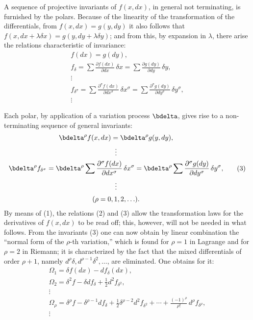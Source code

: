 \documentclass[11pt]{article}
\begin{document}
A sequence of projective invariants of \(f(x,dx)\), in general not
terminating, is furnished by the polars. Because of the linearity of the
transformation of the differentials, from \(f(x,dx)=g(y,dy)\) it also
follows that
\(f(x,dx+\lambda\delta x)=g(y,dy+\lambda\delta y)\); and from this, by
expansion in \(\lambda\), there arise the relations characteristic of
invariance:
\begin{equation}
\begin{gathered}
f(dx)=g(dy),\\
f_\delta=\sum\frac{\partial f(dx)}{\partial dx}\,\delta x
       =\sum\frac{\partial g(dy)}{\partial dy}\,\delta y,\\
\vdots\\
f_{\delta^\sigma}=
\sum\frac{\partial^\sigma f(dx)}{\partial dx^\sigma}\,\delta x^\sigma
=
\sum\frac{\partial^\sigma g(dy)}{\partial dy^\sigma}\,\delta y^\sigma,\\
\vdots
\end{gathered}
\tag{2}
\end{equation}

Each polar, by application of a variation process \(\bdelta\), gives rise
to a non-terminating sequence of general invariants:
\begin{equation}
\begin{gathered}
\bdelta^\rho f(x,dx)=\bdelta^\rho g(y,dy),\\
\vdots\\
\bdelta^\rho f_{\delta^\sigma}
=\bdelta^\rho\sum\frac{\partial^\sigma f(dx)}{\partial dx^\sigma}\,
\delta x^\sigma
=\bdelta^\rho\sum\frac{\partial^\sigma g(dy)}{\partial dy^\sigma}\,
\delta y^\sigma,\\
\vdots\\[0.2em]
(\rho=0,1,2,\ldots).
\end{gathered}
\tag{3}
\end{equation}
By means of (1), the relations (2) and (3) allow the transformation laws
for the derivatives of \(f(x,dx)\) to be read off; this, however, will
not be needed in what follows. From the invariants (3) one can now obtain
by linear combination the ``normal form of the \(\rho\)-th variation,''
which is found for \(\rho=1\) in Lagrange and for \(\rho=2\) in Riemann;
it is characterized by the fact that the mixed differentials of order
\(\rho+1\), namely \(d^\rho\delta,d^{\rho-1}\delta^2,\ldots\), are
eliminated. One obtains for it:
\begin{equation}
\begin{gathered}
\Omega_1=\delta f(dx)-d f_\delta(dx),\\
\Omega_2=\delta^2 f-\delta d f_\delta+\frac12 d^2 f_{\delta^2},\\
\vdots\\
\Omega_\rho=\delta^\rho f-\delta^{\rho-1}d f_\delta
+\frac12\delta^{\rho-2}d^2 f_{\delta^2}
+\cdots+\frac{(-1)^\rho}{\rho!}\,d^\rho f_{\delta^\rho},\\
\vdots
\end{gathered}
\tag{4}
\end{equation}
\end{document}
